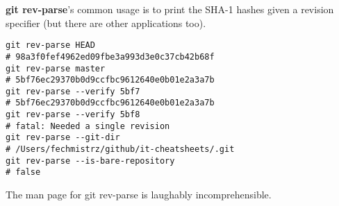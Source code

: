 %

\textbf{git rev-parse}'s  common usage is to print the SHA-1 hashes given a revision specifier (but there are other applications too).

\begin{verbatim}
git rev-parse HEAD
# 98a3f0fef4962ed09fbe3a993d3e0c37cb42b68f
git rev-parse master
# 5bf76ec29370b0d9ccfbc9612640e0b01e2a3a7b
git rev-parse --verify 5bf7
# 5bf76ec29370b0d9ccfbc9612640e0b01e2a3a7b
git rev-parse --verify 5bf8
# fatal: Needed a single revision
git rev-parse --git-dir
# /Users/fechmistrz/github/it-cheatsheets/.git
git rev-parse --is-bare-repository 
# false
\end{verbatim}

The man page for git rev-parse is laughably incomprehensible.

%